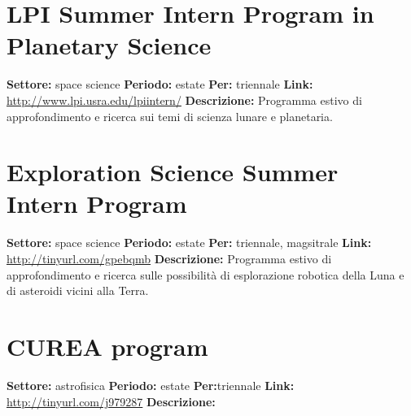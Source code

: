 \documentclass[a4paper,10pt]{article}
\begin{document}
\section{LPI Summer Intern Program in Planetary Science}
\textbf{Settore:} space science\newline
\textbf{Periodo:} estate\newline
\textbf{Per:} triennale\newline
\textbf{Link:} \url{http://www.lpi.usra.edu/lpiintern/} \newline
\textbf{Descrizione:}  Programma estivo di approfondimento e ricerca sui temi di scienza lunare e planetaria. 

\section{Exploration Science Summer Intern Program}
\textbf{Settore:} space science\newline
\textbf{Periodo:} estate \newline
\textbf{Per:} triennale, magsitrale\newline
\textbf{Link:} \url{http://tinyurl.com/gpebqmb} \newline
\textbf{Descrizione:} Programma estivo di approfondimento e ricerca sulle possibilità di esplorazione robotica della Luna e di asteroidi vicini alla Terra. 

\section{CUREA program}
\textbf{Settore:} astrofisica\newline
\textbf{Periodo:} estate \newline
\textbf{Per:}triennale\newline
\textbf{Link:} \url{http://tinyurl.com/j979287} \newline
\textbf{Descrizione:}  
\end{document}
